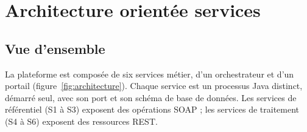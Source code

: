 \chapter{Architecture orientée services}\label{chap:architecture}

\section{Vue d'ensemble}

La plateforme est composée de six services métier, d'un orchestrateur et d'un portail (figure~\ref{fig:architecture}). Chaque service est un processus Java distinct, démarré seul, avec son port et son schéma de base de données. Les services de référentiel (S1 à S3) exposent des opérations SOAP ; les services de traitement (S4 à S6) exposent des ressources REST.

